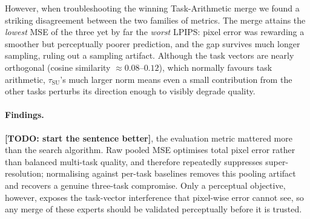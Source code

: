 \documentclass{article}
\newcommand{\todo}[1]{\textbf{\color{red}[TODO: #1]}}
\begin{document}

However, when troubleshooting the winning Task-Arithmetic merge we found a striking disagreement between the two families of metrics. The merge attains the \emph{lowest} MSE of the three yet by far the \emph{worst} LPIPS: pixel error was rewarding a smoother but perceptually poorer prediction, and the gap survives much longer sampling, ruling out a sampling artifact. Although the task vectors are nearly orthogonal (cosine similarity $\approx 0.08$--$0.12$), which normally favours task arithmetic, $\tau_{\mathrm{SU}}$'s much larger norm means even a small contribution from the other tasks perturbs its direction enough to visibly degrade quality.

\paragraph*{Findings.} \todo{start the sentence better}, the evaluation metric mattered more than the search algorithm. Raw pooled MSE optimises total pixel error rather than balanced multi-task quality, and therefore repeatedly suppresses super-resolution; normalising against per-task baselines removes this pooling artifact and recovers a genuine three-task compromise. Only a perceptual objective, however, exposes the task-vector interference that pixel-wise error cannot see, so any merge of these experts should be validated perceptually before it is trusted.
\end{document}
